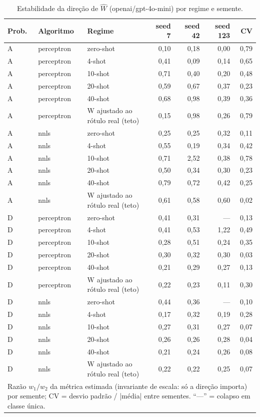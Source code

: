 \begin{table}[htbp]
\centering
\small
\caption{Estabilidade da direção de $\hat{W}$ (openai/gpt-4o-mini) por regime e semente.}
\label{tab:T4_W_gpt4mini}
\begin{tabular}{lllrrrr}
\toprule
Prob. & Algoritmo & Regime & seed 7 & seed 42 & seed 123 & CV \\
\midrule
A & perceptron & zero-shot & 0,10 & 0,18 & 0,00 & 0,79 \\
A & perceptron & 4-shot & 0,41 & 0,09 & 0,14 & 0,65 \\
A & perceptron & 10-shot & 0,71 & 0,40 & 0,20 & 0,48 \\
A & perceptron & 20-shot & 0,59 & 0,67 & 0,37 & 0,23 \\
A & perceptron & 40-shot & 0,68 & 0,98 & 0,39 & 0,36 \\
A & perceptron & W ajustado ao rótulo real (teto) & 0,15 & 0,98 & 0,26 & 0,79 \\
\midrule
A & nnls & zero-shot & 0,25 & 0,25 & 0,32 & 0,11 \\
A & nnls & 4-shot & 0,55 & 0,19 & 0,34 & 0,42 \\
A & nnls & 10-shot & 0,71 & 2,52 & 0,38 & 0,78 \\
A & nnls & 20-shot & 0,50 & 0,34 & 0,30 & 0,23 \\
A & nnls & 40-shot & 0,79 & 0,72 & 0,42 & 0,25 \\
A & nnls & W ajustado ao rótulo real (teto) & 0,61 & 0,58 & 0,60 & 0,02 \\
\midrule
D & perceptron & zero-shot & 0,41 & 0,31 & — & 0,13 \\
D & perceptron & 4-shot & 0,41 & 0,53 & 1,22 & 0,49 \\
D & perceptron & 10-shot & 0,28 & 0,51 & 0,24 & 0,35 \\
D & perceptron & 20-shot & 0,30 & 0,32 & 0,30 & 0,03 \\
D & perceptron & 40-shot & 0,21 & 0,29 & 0,27 & 0,13 \\
D & perceptron & W ajustado ao rótulo real (teto) & 0,22 & 0,23 & 0,11 & 0,30 \\
\midrule
D & nnls & zero-shot & 0,44 & 0,36 & — & 0,10 \\
D & nnls & 4-shot & 0,17 & 0,32 & 0,19 & 0,28 \\
D & nnls & 10-shot & 0,27 & 0,31 & 0,27 & 0,07 \\
D & nnls & 20-shot & 0,26 & 0,26 & 0,28 & 0,04 \\
D & nnls & 40-shot & 0,21 & 0,24 & 0,26 & 0,08 \\
D & nnls & W ajustado ao rótulo real (teto) & 0,22 & 0,22 & 0,25 & 0,07 \\
\bottomrule
\multicolumn{7}{p{0.95\linewidth}}{\footnotesize Razão $w_1/w_2$ da métrica estimada (invariante de escala: só a direção importa) por semente; CV = desvio padrão / |média| entre sementes. ``—'' = colapso em classe única.} \\
\end{tabular}
\end{table}
